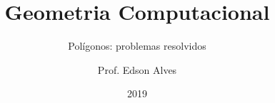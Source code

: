 \title{Geometria Computacional}
\subtitle{Polígonos: problemas resolvidos}
\date{2019}
\author{Prof. Edson Alves}
